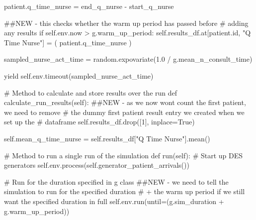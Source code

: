 \documentclass[
  letterpaper,
  DIV=11,
  numbers=noendperiod]{scrreprt}
\newenvironment{Shaded}{\begin{snugshade}}{\end{snugshade}}
\newcommand{\BuiltInTok}[1]{\textcolor[rgb]{0.00,0.23,0.31}{#1}}
\newcommand{\CommentTok}[1]{\textcolor[rgb]{0.37,0.37,0.37}{#1}}
\newcommand{\ControlFlowTok}[1]{\textcolor[rgb]{0.00,0.23,0.31}{#1}}
\newcommand{\DecValTok}[1]{\textcolor[rgb]{0.68,0.00,0.00}{#1}}
\newcommand{\FloatTok}[1]{\textcolor[rgb]{0.68,0.00,0.00}{#1}}
\newcommand{\KeywordTok}[1]{\textcolor[rgb]{0.00,0.23,0.31}{#1}}
\newcommand{\NormalTok}[1]{\textcolor[rgb]{0.00,0.23,0.31}{#1}}
\newcommand{\OperatorTok}[1]{\textcolor[rgb]{0.37,0.37,0.37}{#1}}
\newcommand{\StringTok}[1]{\textcolor[rgb]{0.13,0.47,0.30}{#1}}
\newcommand{\VariableTok}[1]{\textcolor[rgb]{0.07,0.07,0.07}{#1}}
\begin{document}
\begin{Shaded}
\begin{Highlighting}[]
\NormalTok{            patient.q\_time\_nurse }\OperatorTok{=}\NormalTok{ end\_q\_nurse }\OperatorTok{{-}}\NormalTok{ start\_q\_nurse}

            \CommentTok{\#\#NEW {-} this checks whether the warm up period has passed before}
            \CommentTok{\# adding any results}
            \ControlFlowTok{if} \VariableTok{self}\NormalTok{.env.now }\OperatorTok{\textgreater{}}\NormalTok{ g.warm\_up\_period:}
                \VariableTok{self}\NormalTok{.results\_df.at[patient.}\BuiltInTok{id}\NormalTok{, }\StringTok{"Q Time Nurse"}\NormalTok{] }\OperatorTok{=}\NormalTok{ (}
\NormalTok{                    patient.q\_time\_nurse}
\NormalTok{                )}

\NormalTok{            sampled\_nurse\_act\_time }\OperatorTok{=}\NormalTok{ random.expovariate(}\FloatTok{1.0} \OperatorTok{/}
\NormalTok{                                                        g.mean\_n\_consult\_time)}

            \ControlFlowTok{yield} \VariableTok{self}\NormalTok{.env.timeout(sampled\_nurse\_act\_time)}

    \CommentTok{\# Method to calculate and store results over the run}
    \KeywordTok{def}\NormalTok{ calculate\_run\_results(}\VariableTok{self}\NormalTok{):}
        \CommentTok{\#\#NEW {-} as we now won\textquotesingle{}t count the first patient, we need to remove}
        \CommentTok{\# the dummy first patient result entry we created when we set up the}
        \CommentTok{\# dataframe}
        \VariableTok{self}\NormalTok{.results\_df.drop([}\DecValTok{1}\NormalTok{], inplace}\OperatorTok{=}\VariableTok{True}\NormalTok{)}

        \VariableTok{self}\NormalTok{.mean\_q\_time\_nurse }\OperatorTok{=} \VariableTok{self}\NormalTok{.results\_df[}\StringTok{"Q Time Nurse"}\NormalTok{].mean()}

    \CommentTok{\# Method to run a single run of the simulation}
    \KeywordTok{def}\NormalTok{ run(}\VariableTok{self}\NormalTok{):}
        \CommentTok{\# Start up DES generators}
        \VariableTok{self}\NormalTok{.env.process(}\VariableTok{self}\NormalTok{.generator\_patient\_arrivals())}

        \CommentTok{\# Run for the duration specified in g class}
        \CommentTok{\#\#NEW {-} we need to tell the simulation to run for the specified duration}
        \CommentTok{\# + the warm up period if we still want the specified duration in full}
        \VariableTok{self}\NormalTok{.env.run(until}\OperatorTok{=}\NormalTok{(g.sim\_duration }\OperatorTok{+}\NormalTok{ g.warm\_up\_period))}


\end{Highlighting}
\end{Shaded}
\end{document}
